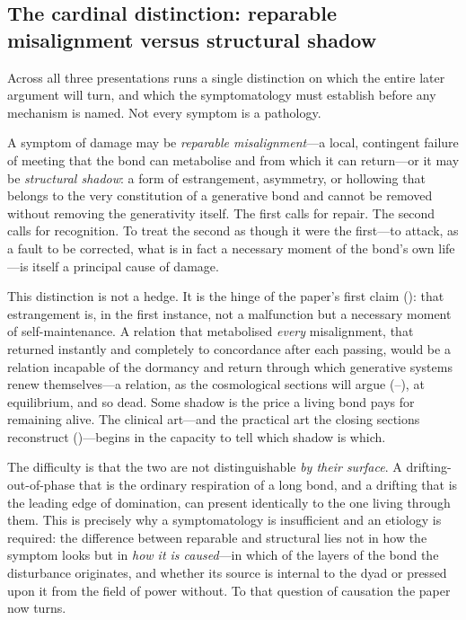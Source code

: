 \subsection{The cardinal distinction: reparable misalignment versus structural shadow}
\label{p17:sub:symptom-distinction}

Across all three presentations runs a single distinction on which the entire later argument will turn, and which the symptomatology must establish before any mechanism is named. Not every symptom is a pathology.

\begin{claim}
A symptom of damage may be \emph{reparable misalignment}---a local, contingent failure of meeting that the bond can metabolise and from which it can return---or it may be \emph{structural shadow}: a form of estrangement, asymmetry, or hollowing that belongs to the very constitution of a generative bond and cannot be removed without removing the generativity itself. The first calls for repair. The second calls for recognition. To treat the second as though it were the first---to attack, as a fault to be corrected, what is in fact a necessary moment of the bond's own life---is itself a principal cause of damage.
\end{claim}

\noindent
This distinction is not a hedge. It is the hinge of the paper's first claim (): that estrangement is, in the first instance, not a malfunction but a necessary moment of self-maintenance. A relation that metabolised \emph{every} misalignment, that returned instantly and completely to concordance after each passing, would be a relation incapable of the dormancy and return through which generative systems renew themselves---a relation, as the cosmological sections will argue (--), at equilibrium, and so dead. Some shadow is the price a living bond pays for remaining alive. The clinical art---and the practical art the closing sections reconstruct ()---begins in the capacity to tell which shadow is which.

The difficulty is that the two are not distinguishable \emph{by their surface}. A drifting-out-of-phase that is the ordinary respiration of a long bond, and a drifting that is the leading edge of domination, can present identically to the one living through them. This is precisely why a symptomatology is insufficient and an etiology is required: the difference between reparable and structural lies not in how the symptom looks but in \emph{how it is caused}---in which of the layers of the bond the disturbance originates, and whether its source is internal to the dyad or pressed upon it from the field of power without. To that question of causation the paper now turns.

